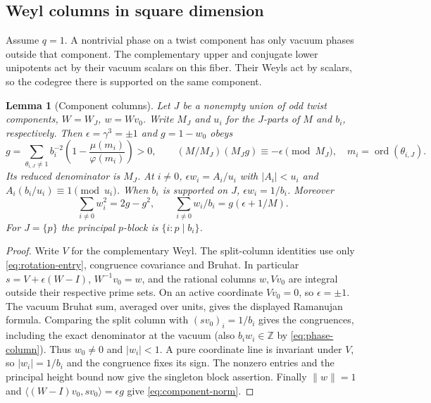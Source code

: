\documentclass[11pt]{amsart}
\numberwithin{equation}{section}
\newtheorem{lemma}[theorem]{Lemma}
\theoremstyle{definition}
\theoremstyle{plain}
\newcommand{\ZZ}{\mathbb Z}
\begin{document}
\subsection{Weyl columns in square dimension}
Assume $q=1$. A nontrivial phase on a twist component has only
vacuum phases outside that component. The complementary upper and
conjugate lower unipotents act by their vacuum scalars on this
fiber. Their Weyls act by scalars, so the codegree there is
supported on the same component.

\begin{lemma}[Component columns]\label{result:component-column}
Let $J$ be a nonempty union of odd twist components, $W=W_J$, $w=Wv_0$.
Write $M_J$ and $u_i$ for the $J$-parts of $M$ and $b_i$,
respectively. Then $\epsilon=\gamma^3=\pm1$ and $g=1-w_0$ obeys
\[
 g=\sum_{\theta_{i,J}\ne1}b_i^{-2}
     \left(1-\frac{\mu(m_i)}{\varphi(m_i)}\right)>0,\qquad
 (M/M_J)(M_Jg)\equiv-\epsilon\pmod {M_J},
 \quad m_i=\operatorname{ord}(\theta_{i,J}).
\]
Its reduced denominator is $M_J$. At $i\ne0$,
$\epsilon w_i=A_i/u_i$ with $|A_i|<u_i$ and
$A_i(b_i/u_i)\equiv1\pmod{u_i}$. When $b_i$ is supported on $J$,
$\epsilon w_i=1/b_i$. Moreover
\begin{equation}\label{eq:component-norm}
 \sum_{i\ne0}w_i^2=2g-g^2,\qquad
 \sum_{i\ne0}w_i/b_i=g(\epsilon+1/M).
\end{equation}
For $J=\{p\}$ the principal $p$-block is $\{i:p\mid b_i\}$.
\end{lemma}
\begin{proof}
Write $V$ for the complementary Weyl. The split-column identities
\cite[Theorem~6.1, Lemma~6.2, Proposition~6.3]{BDPcore} use only
\eqref{eq:rotation-entry}, congruence covariance and Bruhat. In
particular $s=V+\epsilon(W-I)$, $W^{-1}v_0=w$, and the rational
columns $w,Vv_0$ are integral outside their respective prime sets.
On an active coordinate $Vv_0=0$, so $\epsilon=\pm1$.
The vacuum Bruhat sum, averaged over units, gives the displayed
Ramanujan formula. Comparing the split column with
$(sv_0)_i=1/b_i$ gives the congruences, including the exact
denominator at the vacuum (also $b_iw_i\in\ZZ$ by
\eqref{eq:phase-column}). Thus $w_0\ne0$ and $|w_i|<1$. A pure
coordinate line is invariant under $V$, so $|w_i|=1/b_i$ and
the congruence fixes its sign. The nonzero entries and the
principal height bound now give the singleton block assertion.
Finally $\|w\|=1$ and $\langle(W-I)v_0,sv_0\rangle=\epsilon g$
give \eqref{eq:component-norm}.
\end{proof}
\end{document}
